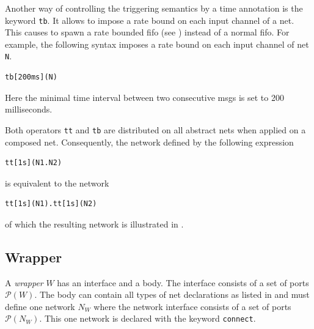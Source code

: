 

Another way of controlling the triggering semantics by a time annotation is the keyword \texttt{tb}.
It allows to impose a rate bound on each input channel of a net.
This causes to spawn a rate bounded \gls{fifo} (see \Sect{\ref{sect_smx_box_implicit_tb}}) instead of a normal \gls{fifo}.
For example, the following syntax imposes a rate bound on each input channel of net \texttt{N}.
\begin{lstlisting}[numbers=none]
tb[200ms](N)
\end{lstlisting}
Here the minimal time interval between two consecutive \glspl*{msg} is set to 200 milliseconds.

Both operators \texttt{tt} and \texttt{tb} are distributed on all abstract nets when applied on a composed net.
Consequently, the network defined by the following expression
\begin{lstlisting}[numbers=none]
tt[1s](N1.N2)
\end{lstlisting}
is equivalent to the network
\begin{lstlisting}[numbers=none]
tt[1s](N1).tt[1s](N2)
\end{lstlisting}
of which the resulting network is illustrated in \Fig{\ref{fig_smx_tt_ex1}}.

\subsection{Wrapper}
\label{sect_smx_network_wrapper}
A \emph{wrapper} $W$ has an interface and a body.
The interface consists of a set of ports $\mathcal{P}(W)$.
The body can contain all types of net declarations as listed in \Sect{\ref{sect_smx_nets_proto}} and must define one network $N_W$ where the network interface consists of a set of ports $\mathcal{P}(N_W)$.
This one network is declared with the keyword \texttt{connect}.

